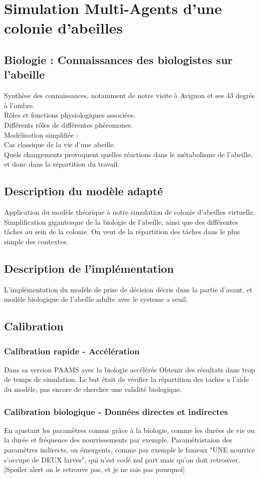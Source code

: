 \documentclass[10pt,a4paper]{article}
\begin{document}
\section{Simulation Multi-Agents d'une colonie d'abeilles}
	\subsection{Biologie : Connaissances des biologistes sur l'abeille}
		Synthèse des connaissances, notamment de notre visite à Avignon et ses 43 degrés à l'ombre.\\
		
		Rôles et fonctions physiologiques associées.\\
		Différents rôles de différentes phéromones.\\
		Modélisation simplifiée : \\
		Cas classique de la vie d'une abeille.\\
		Quels changements provoquent quelles réactions dans le métabolisme de l'abeille, et donc dans la répartition du travail.
	\subsection{Description du modèle adapté}
		Application du modèle théorique à notre simulation de colonie d'abeilles virtuelle.
		Simplification gigantesque de la biologie de l'abeille, ainsi que des différentes tâches au sein de la colonie.
		On veut de la répartition des tâches dans le plus simple des contextes.
	\subsection{Description de l'implémentation}
		L'implémentation du modèle de prise de décision décris dans la partie d'avant, et modèle biologique de l'abeille adulte avec le systeme a seuil.
	\subsection{Calibration}
		\subsubsection{Calibration rapide - Accélération}
			Dans sa version PAAMS avec la biologie accélérée
			Obtenir des résultats dans trop de temps de simulation. Le but était de vérifier la répartition des taches a l'aide du modèle, pas encore de chercher une validité biologique.
		\subsubsection{Calibration biologique - Données directes et indirectes}
			En ajustant les paramètres connus grâce à la biologie, comme les durées de vie ou la durée et fréquence des nourrissements par exemple.
			Paramétristaion des paramètres indirects, ou émergents, comme par exemple le fameux "UNE nourrice s'occupe de DEUX larves", qui n'est codé nul part mais qu'on doit retrouver. [Spoiler alert on le retrouve pas, et je ne sais pas pourquoi]
\end{document}
